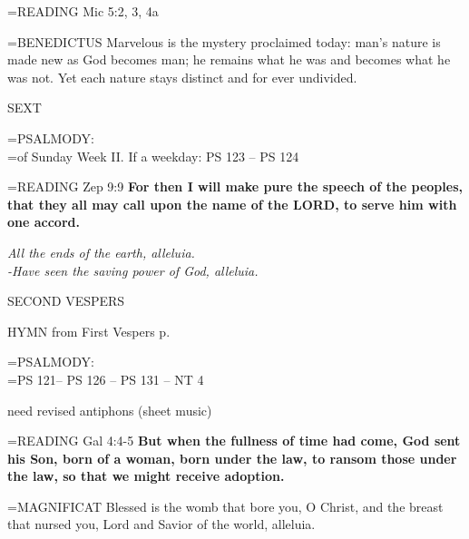 \hangindent=\parindent \small{READING}    Mic 5:2, 3, 4a \textbf{   \\}

\hangindent=\parindent \small{BENEDICTUS 	Marvelous is the mystery proclaimed today: man's nature is made new as God becomes man; he remains what he was and becomes what he was not. Yet each nature stays distinct and for ever undivided.\\}

\begin{flushleft}\normalsize SEXT\\\end{flushleft}

\hangindent=\parindent \small{PSALMODY:}\\
\hangindent=\parindent  of Sunday Week II. If a weekday: PS 123 -- PS 124\vspace{0.5em}

\hangindent=\parindent \small{READING}    Zep 9:9 \textbf{   For then I will make pure the speech of the peoples, that they all may call upon the name of the LORD, to serve him with one accord.}

\begin{center}
\textit{All the ends of the earth, alleluia.\\
-Have seen the saving power of God, alleluia.}
\end{center}

\begin{flushleft}\normalsize SECOND VESPERS\\\end{flushleft}

HYMN from First Vespers p. \pageref{bvm:motherofgod:hymn}

\hangindent=\parindent \small{PSALMODY:}\\
\hangindent=\parindent  PS 121-- PS 126 -- PS 131 -- NT 4\vspace{0.5em}

need revised antiphons (sheet music)

\hangindent=\parindent \small{READING}    Gal 4:4-5 \textbf{   But when the fullness of time had come, God sent his Son, born of a woman, born under the law, to ransom those under the law, so that we might receive adoption.\\}

\hangindent=\parindent \small{MAGNIFICAT 	Blessed is the womb that bore you, O Christ, and the breast that nursed you, Lord and Savior of the world, alleluia.\\}
